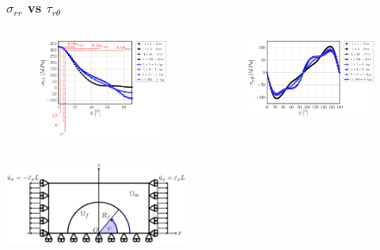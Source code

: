 \documentclass[first,firstsupp,lastsupp,last,hyperref,table]{ETHclass}
\begin{document}
\addtocounter{framenumber}{-1}

\begin{frame}
\frametitle{\vspace{0.2cm}\small $\sigma_{rr}$ vs $\tau_{r\theta}$}
\vspace{-.75cm}
\centering
\begin{columns}[c]
\centering
\begin{column}{0.5\textwidth}
\centering
\begin{figure}
\centering
\includegraphics[width=\columnwidth]{vf60-nodamage-sigmar.pdf}
\end{figure}
\end{column}
\begin{column}{0.5\textwidth}
\centering
\begin{figure}
\centering
\includegraphics[width=\columnwidth]{vf60-nodamage-taurt.pdf}
\end{figure}
\end{column}
\end{columns}
\vspace{-0.25cm}
\includegraphics[width=0.45\textwidth]{refAngle.pdf}
\end{frame}
\end{document}
